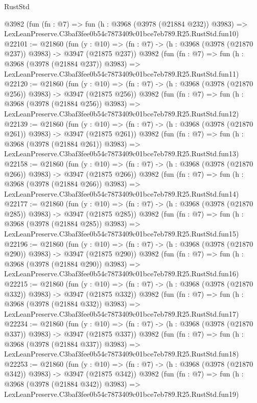 \begin{lexlean}{RustStd}
\begin{coremodule}
    @3982
    (fun (fn : @7) =>
    fun (h : @3968 (@3978 (@21884 @232)) @3983) =>
    LexLeanPreserve.C3baf3fee0b54c7873409c01bce7eb789.R25.RustStd.fun10)
@22101 := @21860
    (fun (y : @10) => (fn : @7) -> (h : @3968 (@3978 (@21870 @237)) @3983) -> @3947 (@21875 @237))
    @3982
    (fun (fn : @7) =>
    fun (h : @3968 (@3978 (@21884 @237)) @3983) =>
    LexLeanPreserve.C3baf3fee0b54c7873409c01bce7eb789.R25.RustStd.fun11)
@22120 := @21860
    (fun (y : @10) => (fn : @7) -> (h : @3968 (@3978 (@21870 @256)) @3983) -> @3947 (@21875 @256))
    @3982
    (fun (fn : @7) =>
    fun (h : @3968 (@3978 (@21884 @256)) @3983) =>
    LexLeanPreserve.C3baf3fee0b54c7873409c01bce7eb789.R25.RustStd.fun12)
@22139 := @21860
    (fun (y : @10) => (fn : @7) -> (h : @3968 (@3978 (@21870 @261)) @3983) -> @3947 (@21875 @261))
    @3982
    (fun (fn : @7) =>
    fun (h : @3968 (@3978 (@21884 @261)) @3983) =>
    LexLeanPreserve.C3baf3fee0b54c7873409c01bce7eb789.R25.RustStd.fun13)
@22158 := @21860
    (fun (y : @10) => (fn : @7) -> (h : @3968 (@3978 (@21870 @266)) @3983) -> @3947 (@21875 @266))
    @3982
    (fun (fn : @7) =>
    fun (h : @3968 (@3978 (@21884 @266)) @3983) =>
    LexLeanPreserve.C3baf3fee0b54c7873409c01bce7eb789.R25.RustStd.fun14)
@22177 := @21860
    (fun (y : @10) => (fn : @7) -> (h : @3968 (@3978 (@21870 @285)) @3983) -> @3947 (@21875 @285))
    @3982
    (fun (fn : @7) =>
    fun (h : @3968 (@3978 (@21884 @285)) @3983) =>
    LexLeanPreserve.C3baf3fee0b54c7873409c01bce7eb789.R25.RustStd.fun15)
@22196 := @21860
    (fun (y : @10) => (fn : @7) -> (h : @3968 (@3978 (@21870 @290)) @3983) -> @3947 (@21875 @290))
    @3982
    (fun (fn : @7) =>
    fun (h : @3968 (@3978 (@21884 @290)) @3983) =>
    LexLeanPreserve.C3baf3fee0b54c7873409c01bce7eb789.R25.RustStd.fun16)
@22215 := @21860
    (fun (y : @10) => (fn : @7) -> (h : @3968 (@3978 (@21870 @332)) @3983) -> @3947 (@21875 @332))
    @3982
    (fun (fn : @7) =>
    fun (h : @3968 (@3978 (@21884 @332)) @3983) =>
    LexLeanPreserve.C3baf3fee0b54c7873409c01bce7eb789.R25.RustStd.fun17)
@22234 := @21860
    (fun (y : @10) => (fn : @7) -> (h : @3968 (@3978 (@21870 @337)) @3983) -> @3947 (@21875 @337))
    @3982
    (fun (fn : @7) =>
    fun (h : @3968 (@3978 (@21884 @337)) @3983) =>
    LexLeanPreserve.C3baf3fee0b54c7873409c01bce7eb789.R25.RustStd.fun18)
@22253 := @21860
    (fun (y : @10) => (fn : @7) -> (h : @3968 (@3978 (@21870 @342)) @3983) -> @3947 (@21875 @342))
    @3982
    (fun (fn : @7) =>
    fun (h : @3968 (@3978 (@21884 @342)) @3983) =>
    LexLeanPreserve.C3baf3fee0b54c7873409c01bce7eb789.R25.RustStd.fun19)

\end{coremodule}
\end{lexlean}
